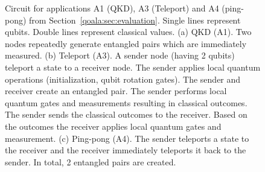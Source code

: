 \begin{figure}
    \centering

    \vspace{1cm}
    \vspace{1cm}
    \caption{
    Circuit for applications A1 (QKD), A3 (Teleport) and A4 (ping-pong) from Section~\ref{qoala:sec:evaluation}.
    Single lines represent qubits. Double lines represent classical values.
    (a) QKD (A1). Two nodes repeatedly generate entangled pairs which are immediately measured.
    (b) Teleport (A3). A sender node (having 2 qubits) teleport a state to a receiver node. The sender applies local quantum operations (initialization, qubit rotation gates).
    The sender and receiver create an entangled pair. The sender performs local quantum gates and measurements resulting in classical outcomes.
    The sender sends the classical outcomes to the receiver. Based on the outcomes the receiver applies local quantum gates and measurement.
    (c) Ping-pong (A4). The sender teleports a state to the receiver and the receiver immediately teleports it back to the sender. In total, 2 entangled pairs are created.
    }
    \label{qoala:fig:app:circuits_1}
\end{figure}

